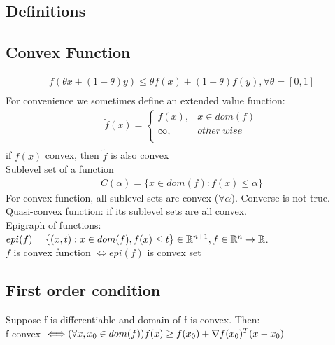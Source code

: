 \documentclass[8pt]{extarticle}
\newcommand{\R}{\mathbb{R}}
\begin{document}
\begin{multicols*}{2}
  \pagebreak
  
  \section{Definitions}

  \subsection{Convex Function}
  \begin{align*}
    f(\theta x +(1-\theta) y) \leq \theta f(x) + (1-\theta) f(y), \forall \theta = [0,1]\\
  \end{align*}
  For convenience we sometimes define an extended value function:\\
  \begin{align*}
    \tilde{f}(x) = \begin{cases}
      f(x), & x \in dom(f)\\
      \infty, & other\ wise\\
    \end{cases}\\
  \end{align*}
  if $f(x)$ convex, then $\tilde{f}$ is also convex\\

  Sublevel set of a function
  \begin{align*}
    C(\alpha) = \{ x \in dom(f): f(x) \leq \alpha \}
  \end{align*}
  For convex function, all sublevel sets are convex ($\forall \alpha$). Converse is not true.\\
  
  Quasi-convex function: if its sublevel sets are all convex.\\
  
  Epigraph of functions:\\
  $epi(f)=\{(x,t): x \in dom(f), f(x) \leq t\} \in \R^{n+1}, \\f \in \R^n \to \R$.\\
  
 $f$ is convex function $\iff epi(f)$ is convex set\\

 \subsection{First order condition}
 Suppose f is differentiable and domain of f is convex. Then:\\
 f convex $\iff \\ (\forall x,x_0 \in dom(f)) f(x) \geq f(x_0) + \nabla f(x_0)^T(x-x_0)$\\


\end{multicols*}
\end{document}
